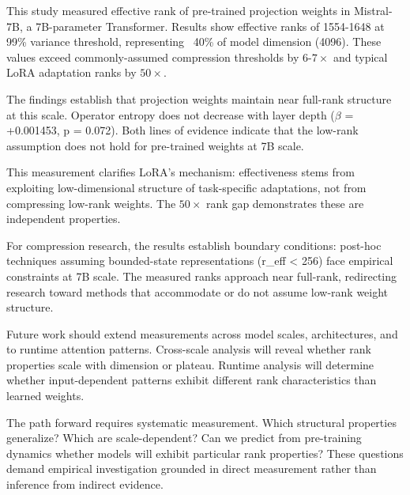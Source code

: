 
This study measured effective rank of pre-trained projection weights in Mistral-7B, a 7B-parameter Transformer. Results show effective ranks of 1554-1648 at 99\% variance threshold, representing ~40\% of model dimension (4096). These values exceed commonly-assumed compression thresholds by 6-$7\times$ and typical LoRA adaptation ranks by $50\times$.

The findings establish that projection weights maintain near full-rank structure at this scale. Operator entropy does not decrease with layer depth ($\beta$ = +0.001453, p = 0.072). Both lines of evidence indicate that the low-rank assumption does not hold for pre-trained weights at 7B scale.

This measurement clarifies LoRA's mechanism: effectiveness stems from exploiting low-dimensional structure of task-specific adaptations, not from compressing low-rank weights. The $50\times$ rank gap demonstrates these are independent properties.

For compression research, the results establish boundary conditions: post-hoc techniques assuming bounded-state representations (r\_eff < 256) face empirical constraints at 7B scale. The measured ranks approach near full-rank, redirecting research toward methods that accommodate or do not assume low-rank weight structure.

Future work should extend measurements across model scales, architectures, and to runtime attention patterns. Cross-scale analysis will reveal whether rank properties scale with dimension or plateau. Runtime analysis will determine whether input-dependent patterns exhibit different rank characteristics than learned weights.

The path forward requires systematic measurement. Which structural properties generalize? Which are scale-dependent? Can we predict from pre-training dynamics whether models will exhibit particular rank properties? These questions demand empirical investigation grounded in direct measurement rather than inference from indirect evidence.
